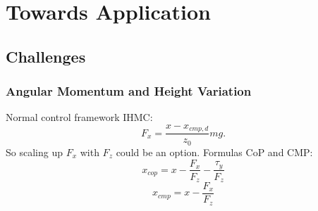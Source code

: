 %
\chapter{Towards Application}

\section{Challenges}
\subsection{Angular Momentum and Height Variation}
Normal control framework IHMC:
\begin{equation}
    F_{x} = \frac{x-x_{cmp,d}}{z_0}mg.
\end{equation}
So scaling up $F_x$ with $F_z$ could be an option.
Formulas \ac{CoP} and \ac{CMP}:
\begin{equation}
    x_{cop}=x-\frac{F_x}{F_z}-\frac{\tau_y}{F_z}
\end{equation}
\begin{equation}
    x_{cmp}=x-\frac{F_x}{F_z}
\end{equation}

